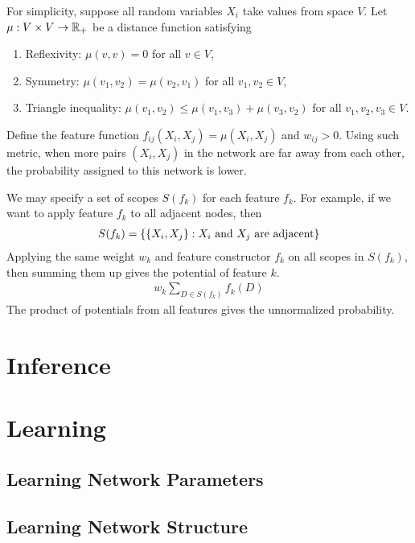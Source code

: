 \documentclass[11pt]{article}
\begin{document}
	\begin{example}
		For simplicity, suppose all random variables $X_i$ take values from space $V$.
		Let $\mu: V \times V \to \mathbb{R}_+$ be a distance function satisfying
		\begin{enumerate}
			\item Reflexivity: $\mu(v, v) = 0$ for all $v \in V$,
			\item Symmetry: $\mu(v_1, v_2) = \mu(v_2, v_1)$ for all $v_1, v_2 \in V$,
			\item Triangle inequality: $\mu(v_1, v_2) \leq \mu(v_1, v_3) + \mu(v_3, v_2)$ for all $v_1, v_2, v_3 \in V$.
		\end{enumerate}
		Define the feature function $f_{ij}(X_i, X_j) = \mu(X_i, X_j)$ and $w_{ij} > 0$.
		Using such metric, when more pairs $(X_i, X_j)$ in the network are far away from each other, the probability assigned to this network is lower.
	\end{example}
	
	\begin{example}
		We may specify a set of scopes $S(f_k)$ for each feature $f_k$.
		For example, if we want to apply feature $f_k$ to all adjacent nodes, then
		\begin{align}
			S(f_k) = \{\{X_i, X_j\}: X_i\text{{ and }}X_j \text{{ are adjacent}} \}
		\end{align}
		Applying the same weight $w_k$ and feature constructor $f_k$ on all scopes in $S(f_k)$, then summing them up gives the potential of feature $k$.
		\begin{align}
			w_k \sum_{D \in S(f_k)} f_k(D)
		\end{align}
		The product of potentials from all features gives the unnormalized probability.
	\end{example}

	\section{Inference}
	\section{Learning}
	\subsection{Learning Network Parameters}
	
	\subsection{Learning Network Structure}
\end{document}
